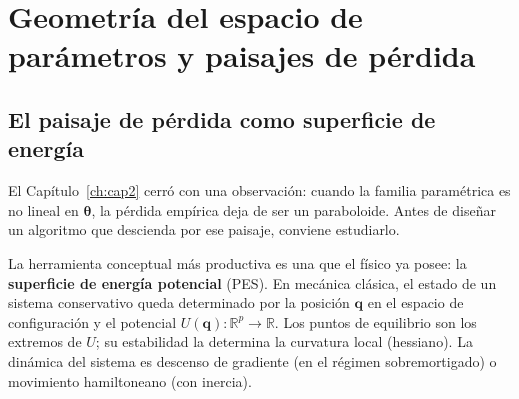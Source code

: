 
\chapter{Geometría del espacio de parámetros y paisajes de pérdida}
\label{ch:cap3}

\section{El paisaje de pérdida como superficie de energía}
\label{sec:paisaje_intro}


El Capítulo~\ref{ch:cap2} cerró con una observación: cuando la familia
paramétrica es no lineal en $\bm{\theta}$, la pérdida empírica deja de
ser un paraboloide. Antes de diseñar un algoritmo que descienda por ese
paisaje, conviene estudiarlo.

La herramienta conceptual más productiva es una que el físico ya posee:
la \textbf{superficie de energía potencial} (PES). En mecánica clásica,
el estado de un sistema conservativo queda determinado por la posición
$\bm{q}$ en el espacio de configuración y el potencial
$U(\bm{q}): \mathbb{R}^p \to \mathbb{R}$. Los puntos de equilibrio son
los extremos de $U$; su estabilidad la determina la curvatura local
(hessiano). La dinámica del sistema es descenso de gradiente (en el
régimen sobremortigado) o movimiento hamiltoneano (con inercia).


